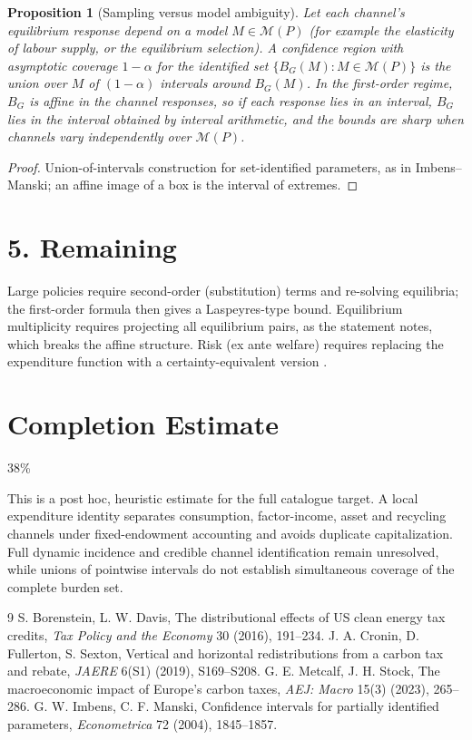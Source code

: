 \documentclass[11pt]{article}
\newtheorem{proposition}[theorem]{Proposition}
\theoremstyle{definition}
\begin{document}
\begin{proposition}[Sampling versus model ambiguity]\label{prop:sets}
Let each channel's equilibrium response depend on a model $M\in\mathcal M(P)$ (for example the elasticity of labour supply,
or the equilibrium selection). A confidence region with asymptotic coverage $1-\alpha$ for the identified set
$\{B_G(M):M\in\mathcal M(P)\}$ is the union over $M$ of $(1-\alpha)$ intervals around $B_G(M)$. In the first-order regime,
$B_G$ is affine in the channel responses, so if each response lies in an interval, $B_G$ lies in the interval obtained by
interval arithmetic, and the bounds are sharp when channels vary independently over $\mathcal M(P)$.
\end{proposition}
\begin{proof}
Union-of-intervals construction for set-identified parameters, as in Imbens--Manski; an affine image of a box is
the interval of extremes.
\end{proof}

\section*{5. Remaining}
Large policies require second-order (substitution) terms and re-solving equilibria; the first-order formula then gives a
Laspeyres-type bound. Equilibrium multiplicity requires projecting all equilibrium pairs, as the statement notes, which
breaks the affine structure. Risk (ex ante welfare) requires replacing the expenditure function with a certainty-equivalent
version \cite{bd,cfs,ms}.

\section{Completion Estimate}
38\%

This is a post hoc, heuristic estimate for the full catalogue target.
A local expenditure identity separates consumption, factor-income, asset and recycling channels under fixed-endowment accounting and avoids duplicate capitalization. Full dynamic incidence and credible channel identification remain unresolved, while unions of pointwise intervals do not establish simultaneous coverage of the complete burden set.

\begin{thebibliography}{9}
 S. Borenstein, L. W. Davis, The distributional effects of US clean energy tax credits, \emph{Tax Policy and the Economy} 30 (2016), 191--234.
 J. A. Cronin, D. Fullerton, S. Sexton, Vertical and horizontal redistributions from a carbon tax and rebate, \emph{JAERE} 6(S1) (2019), S169--S208.
 G. E. Metcalf, J. H. Stock, The macroeconomic impact of Europe's carbon taxes, \emph{AEJ: Macro} 15(3) (2023), 265--286.
 G. W. Imbens, C. F. Manski, Confidence intervals for partially identified parameters, \emph{Econometrica} 72 (2004), 1845--1857.
\end{thebibliography}
\end{document}
